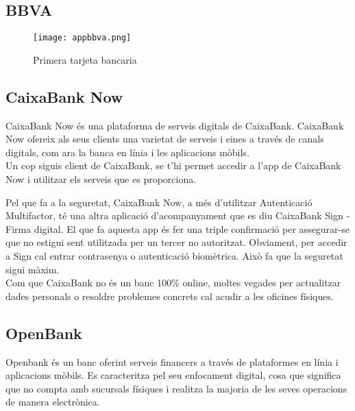
\subsection*{BBVA}




\begin{figure}[h]
    \centering
    \texttt{[image: appbbva.png]}
    \caption{Primera tarjeta bancaria}
\end{figure}  




\subsection*{CaixaBank Now}

CaixaBank Now és una plataforma de serveis digitals de CaixaBank. CaixaBank Now ofereix als seus clients una varietat de serveis i eines a través de canals digitals, com ara la banca en línia i les aplicacions mòbils.\\

Un cop siguis client de CaixaBank, se t'hi permet accedir a l'app de CaixaBank Now i utilitzar els serveis que es proporciona.

Pel que fa a la seguretat, CaixaBank Now, a més d'utilitzar Autenticació Multifactor, té una altra aplicació d'acompanyament que es diu CaixaBank Sign - Firma digital. El que fa aquesta app és fer una triple confirmació per assegurar-se que no estigui sent utilitzada per un tercer no autoritzat. Obviament, per accedir a Sign cal entrar contrasenya o autenticació biomètrica. Això fa que la seguretat sigui màxim.\\

Com que CaixaBank no és un banc 100\% online, moltes vegades per actualitzar dades personals o resoldre problemes concrets cal acudir a les oficines físiques.



\subsection*{OpenBank}


Openbank és un banc oferint serveis financers a través de plataformes en línia i aplicacions mòbils. Es caracteritza pel seu enfocament digital, cosa que significa que no compta amb sucursals físiques i realitza la majoria de les seves operacions de manera electrònica. \\

